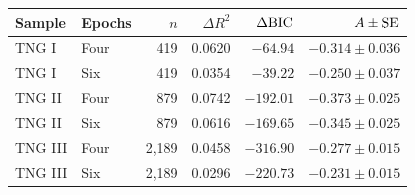\begin{tabular}{llrrrr}\toprule
Sample & Epochs & $n$ & $\Delta R^2$ & $\Delta{\rm BIC}$ & $A\pm{\rm SE}$ \\\midrule
TNG I & Four & 419 & 0.0620 & $-64.94$ & $-0.314 \pm 0.036$ \\
TNG I & Six & 419 & 0.0354 & $-39.22$ & $-0.250 \pm 0.037$ \\
TNG II & Four & 879 & 0.0742 & $-192.01$ & $-0.373 \pm 0.025$ \\
TNG II & Six & 879 & 0.0616 & $-169.65$ & $-0.345 \pm 0.025$ \\
TNG III & Four & 2,189 & 0.0458 & $-316.90$ & $-0.277 \pm 0.015$ \\
TNG III & Six & 2,189 & 0.0296 & $-220.73$ & $-0.231 \pm 0.015$ \\
\bottomrule\end{tabular}
